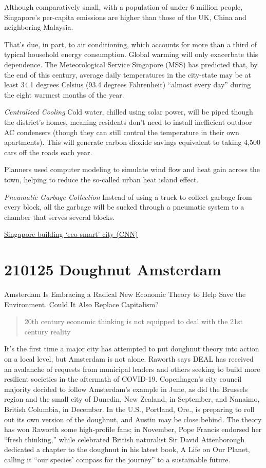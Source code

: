 \documentclass[
]{book}
\begin{document}
Although comparatively small, with a population of under 6 million people, Singapore's per-capita emissions are higher than those of the UK, China and neighboring Malaysia.

That's due, in part, to air conditioning, which accounts for more than a third of typical household energy consumption. Global warming will only exacerbate this dependence. The Meteorological Service Singapore (MSS) has predicted that, by the end of this century, average daily temperatures in the city-state may be at least 34.1 degrees Celsius (93.4 degrees Fahrenheit) ``almost every day'' during the eight warmest months of the year.

\emph{Centralized Cooling}
Cold water, chilled using solar power, will be piped though the district's homes, meaning residents don't need to install inefficient outdoor AC condensers (though they can still control the temperature in their own apartments).
This will generate carbon dioxide savings equivalent to taking 4,500 cars off the roads each year.

Planners used computer modeling to simulate wind flow and heat gain across the town, helping to reduce the so-called urban heat island effect.

\emph{Pneumatic Garbage Collection}
Instead of using a truck to collect garbage from every block, all the garbage will be sucked
through a pneumatic system to a chamber that serves several blocks.

\href{https://edition.cnn.com/style/article/singapore-tengah-eco-town/index.html}{Singapore building `eco smart' city (CNN)}

\hypertarget{doughnut-amsterdam}{%
\section{210125 Doughnut Amsterdam}\label{doughnut-amsterdam}}

Amsterdam Is Embracing a Radical New Economic Theory to Help Save the Environment.
Could It Also Replace Capitalism?

\begin{quote}
20th century economic thinking is not equipped to deal with the 21st century reality
\end{quote}

It's the first time a major city has attempted to put doughnut theory into action on a local level, but Amsterdam is not alone. Raworth says DEAL has received an avalanche of requests from municipal leaders and others seeking to build more resilient societies in the aftermath of COVID-19. Copenhagen's city council majority decided to follow Amsterdam's example in June, as did the Brussels region and the small city of Dunedin, New Zealand, in September, and Nanaimo, British Columbia, in December. In the U.S., Portland, Ore., is preparing to roll out its own version of the doughnut, and Austin may be close behind. The theory has won Raworth some high-profile fans; in November, Pope Francis endorsed her ``fresh thinking,'' while celebrated British naturalist Sir David Attenborough dedicated a chapter to the doughnut in his latest book, A Life on Our Planet, calling it ``our species' compass for the journey'' to a sustainable future.
\end{document}
